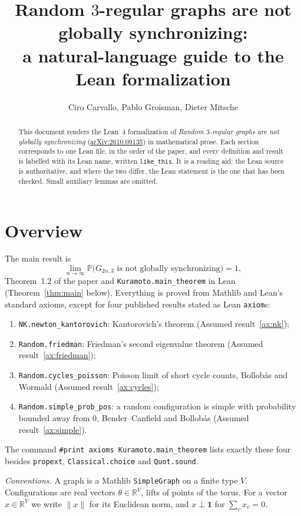\documentclass[11pt]{amsart}
\title[Lean to \TeX{} companion]{Random $3$-regular graphs are not globally synchronizing:\\
a natural-language guide to the Lean formalization}
\author{Ciro Carvallo, Pablo Groisman, Dieter Mitsche}
\date{}
\newcommand{\leanname}[1]{\texttt{\textcolor{black!75}{#1}}}
\newcommand{\R}{\mathbb{R}}
\newcommand{\PP}{\mathbb{P}}
\newcommand{\one}{\mathbf{1}}
\theoremstyle{plain}
\theoremstyle{definition}
\theoremstyle{remark}
\begin{document}
\sloppy

\begin{abstract}
This document renders the Lean~4 formalization of \emph{Random $3$-regular graphs are not
globally synchronizing} (\href{https://arxiv.org/abs/2610.09135}{arXiv:2610.09135}) in
mathematical prose. Each section corresponds to one Lean file, in the order of the paper, and
every definition and result is labelled with its Lean name, written
\leanname{like\_this}. It is a reading aid: the Lean source is authoritative, and where the two
differ, the Lean statement is the one that has been checked. Small auxiliary lemmas are omitted.
\end{abstract}

\maketitle
\tableofcontents

\section*{Overview}

The main result is
\[
  \lim_{n\to\infty}\PP\bigl(G_{2n,3}\text{ is not globally synchronizing}\bigr)=1,
\]
Theorem~1.2 of the paper and \leanname{Kuramoto.main\_theorem} in Lean (Theorem~\ref{thm:main}
below). Everything is proved from Mathlib and Lean's standard axioms, except for four published
results stated as Lean \texttt{axiom}s:
\begin{enumerate}
\item \leanname{NK.newton\_kantorovich}: Kantorovich's theorem (Assumed result~\ref{ax:nk});
\item \leanname{Random.friedman}: Friedman's second eigenvalue theorem (Assumed result~\ref{ax:friedman});
\item \leanname{Random.cycles\_poisson}: Poisson limit of short cycle counts, Bollob\'as and
  Wormald (Assumed result~\ref{ax:cycles});
\item \leanname{Random.simple\_prob\_pos}: a random configuration is simple with probability
  bounded away from $0$, Bender--Canfield and Bollob\'as (Assumed result~\ref{ax:simple}).
\end{enumerate}
The command \texttt{\#print axioms Kuramoto.main\_theorem} lists exactly these four besides
\texttt{propext}, \texttt{Classical.choice} and \texttt{Quot.sound}.

\medskip
\noindent\emph{Conventions.} A graph is a Mathlib \texttt{SimpleGraph} on a finite type $V$.
Configurations are real vectors $\theta\in\R^V$, lifts of points of the torus. For a vector
$x\in\R^V$ we write $\|x\|$ for its Euclidean norm, and $x\perp\one$ for $\sum_v x_v=0$.
\end{document}
